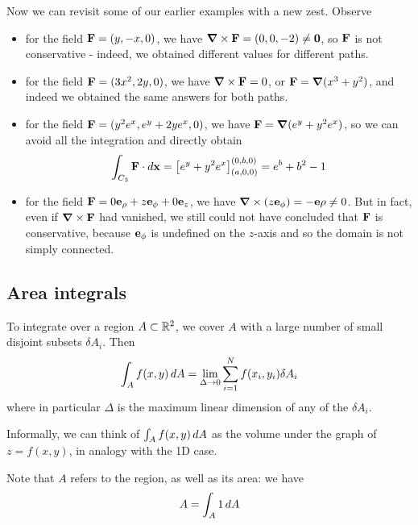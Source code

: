 \documentclass{../../template/note}
\begin{document}
    \begin{example*}
        Now we can revisit some of our earlier examples with a new zest. Observe
        \begin{itemize}
            \item for the field \(\V F = (y, -x, 0)\), we have \(\curl \V F = (0, 0, -2) \neq \V 0\), so \(\V F\) is not conservative - indeed, we obtained different values for different paths.
            \item for the field \(\V F = (3x^2, 2y, 0)\), we have \(\curl \V F = 0\), or \(\V F = \grad(x^3 + y^2)\), and indeed we obtained the same answers for both paths.
            \item for the field \(\V F = (y^2e^x, e^y+2ye^x, 0)\), we have \(\V F = \grad(e^y + y^2e^x)\), so we can avoid all the integration and directly obtain
            \begin{align*}
                \int_{C_3} \V F \cdot d \V x = \left[e^y + y^2e^x\right]^{(0, b, 0)}_{(a, 0, 0)} = e^b + b^2 - 1
            \end{align*}
            \item for the field \(\V F = 0 \V e_\rho + z \V e_\phi + 0 \V e_z\), we have \(\curl (z \V e_\phi) = -\V e\rho \neq 0\). But in fact, even if \(\curl \V F\) had vanished, we still could not have concluded that \(\V F\) is conservative, because \(\V e_\phi\) is undefined on the \(z\)-axis and so the domain is not simply connected.            
        \end{itemize}
    \end{example*}
    
    \subsection{Area integrals}

    To integrate over a region \(A \subset \mathbb R^2\), we cover \(A\) with a large number of small disjoint subsets \(\delta A_i\). Then
    \begin{align*}
        \int_A f(x, y) \,d{A} = \lim_{\Delta \to 0} \sum_{i=1}^N f(x_i, y_i) \delta A_i
    \end{align*}
    where in particular \(\Delta\) is the maximum linear dimension of any of the \(\delta A_i\).

    Informally, we can think of \(\int_A f(x, y) \,d{A}\) as the volume under the graph of \(z = f(x, y)\), in analogy with the 1D case.

    Note that \(A\) refers to the region, as well as its area: we have
    \begin{align*}
        A = \int_A 1 \,d{A}
    \end{align*}
    
\end{document}
